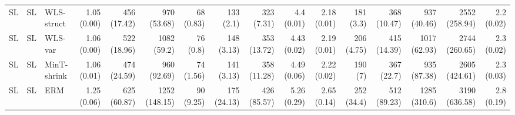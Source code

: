 \documentclass[preprint, 3p, times, twocolumn]{elsarticle}
\begin{document}
\begin{table}
\begin{center}
{{\begin{tabular}{l l l rrrrrrrrrrrrr}
    \hspace{0.1cm} 	SL	&SL	&WLS-struct	&1.05 (0.00)	&456 (17.42)	&970 (53.68)	&68 (0.83)	&133 (2.1)	&323 (7.31)	&4.4 (0.01)	&2.18 (0.01)	&181 (3.3)	&368 (10.47)	&937 (40.46)	&2552 (258.94)	&2.2 (0.02)	\\
    \hspace{0.1cm} 	SL	&SL	&WLS-var	&1.06 (0.00)	&522 (18.96)	&1082 (59.2)	&76 (0.8)	&148 (3.13)	&353 (13.72)	&4.43 (0.02)	&2.19 (0.01)	&206 (4.75)	&415 (14.39)	&1017 (62.93)	&2744 (260.65)	&2.3 (0.02)	\\
    \hspace{0.1cm} 	SL	&SL	&MinT-shrink	&1.06 (0.01)	&474 (24.59)	&960 (92.69)	&74 (1.56)	&141 (3.13)	&358 (11.28)	&4.49 (0.06)	&2.22 (0.02)	&190 (7)	&367 (22.7)	&935 (87.38)	&2605 (424.61)	&2.3 (0.03)	\\
    \hspace{0.1cm} 	SL	&SL	&ERM	&1.25 (0.06)	&625 (60.87)	&1252 (148.15)	&90 (9.25)	&175 (24.13)	&426 (85.57)	&5.26 (0.29)	&2.65 (0.14)	&252 (34.4)	&512 (89.23)	&1285 (310.6)	&3190 (636.58)	&2.8 (0.19)	\\   
    
    \bottomrule
    
  \end{tabular}}}
    \end{center}
    \end{table}
\end{document}
